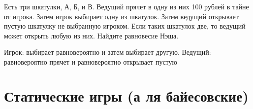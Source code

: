\begin{problem}

Есть три шкатулки, А, Б, и В. Ведущий прячет в одну из них 100 рублей в тайне от игрока. Затем игрок выбирает одну из шкатулок. Затем ведущий открывает пустую шкатулку не выбранную игроком. Если таких шкатулок две, то ведущий может открыть любую из них. Найдите равновесие Нэша.



\begin{sol}
Игрок: выбирает равновероятно и затем выбирает другую. Ведущий: равновероятно прячет и равновероятно открывает пустую
\end{sol}
\end{problem}





\section{Статические игры (а ля байесовские)}


